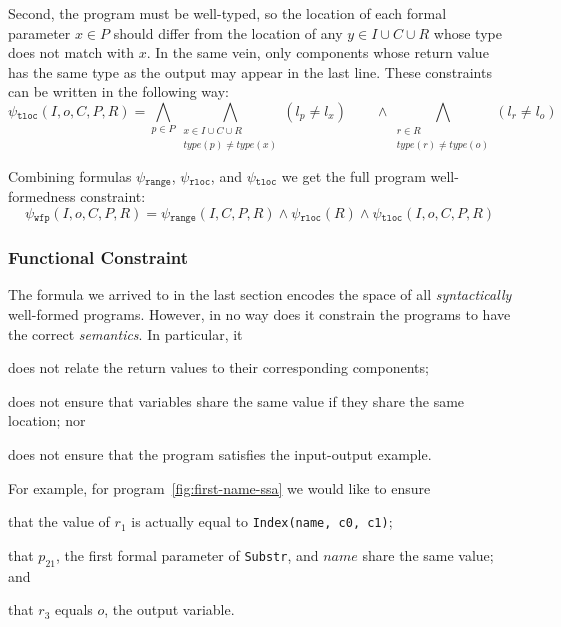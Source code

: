 \noindent
Second, the program must be well-typed, so the location of each formal parameter
$x \in P$ should differ from the location of any $y \in I \cup C \cup R$ whose
type does not match with $x$. In the same vein, only components whose return
value has the same type as the output may appear in the last line. These
constraints can be written in the following way:
%
\[
  \psi{}_{\mathtt{tloc}}(I, o, C, P, R) =
  \bigwedge_{p \in P}
  \bigwedge_{\substack{x \in I \cup C \cup R \\ type(p) \neq type(x)}}
  (l_p \neq l_x)
  \qquad \wedge
  \bigwedge_{\substack{r \in R \\ type(r) \neq type(o)}}
  (l_r \neq l_o)
\]

Combining formulas $\psi{}_{\mathtt{range}}$, $\psi{}_{\mathtt{rloc}}$, and
$\psi{}_{\mathtt{tloc}}$ we get the full program well-formedness constraint:
%
\[
  \psi{}_{\mathtt{wfp}}(I, o, C, P, R) =
  \psi{}_{\mathtt{range}}(I, C, P, R)
  \wedge \psi{}_{\mathtt{rloc}}(R)
  \wedge \psi{}_{\mathtt{tloc}}(I, o, C, P, R)
\]

\subsubsection{Functional Constraint}
\label{sec:functional-constraint}

The formula we arrived to in the last section encodes the space of all
\textit{syntactically} well-formed programs. However, in no way does it
constrain the programs to have the correct \textit{semantics}.
In particular, it 
\begin{enumerate*}[(1)]
\item \label{itm:fc-one} does not relate the return values to their
corresponding components;
\item \label{itm:fc-two} does not ensure that variables share the same value if they
share the same location; nor
\item \label{itm:fc-three} does not ensure that the program satisfies the
input-output example.
\end{enumerate*}
For example, for program~\ref{fig:first-name-ssa} we would like to ensure
\begin{enumerate*}[(1)]
\item that the value of $r_1$ is actually equal to \lstinline{Index(name, c0, c1)};
\item that $p_{21}$, the first formal parameter of \lstinline{Substr}, and $name$
  share the same value; and
\item that $r_3$ equals $o$, the output variable.
\end{enumerate*}


